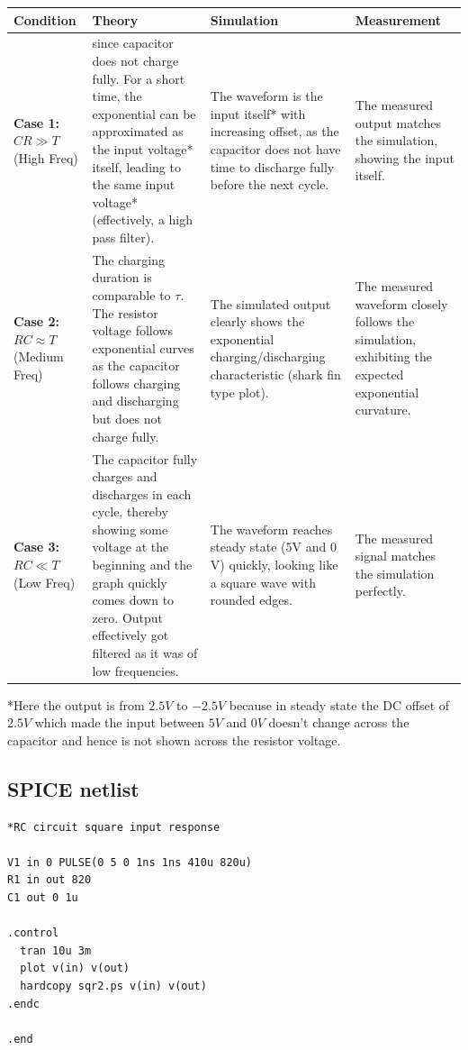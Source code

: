 \documentclass[12pt, a4paper]{article}
\begin{document}
\begin{table}[H]
    \centering
    \begin{tabular}{p{3cm} p{4cm} p{4cm} p{4cm}}
        \toprule
        \textbf{Condition} & \textbf{Theory} & \textbf{Simulation} & \textbf{Measurement} \\
        \midrule
        \textbf{Case 1:} $CR \gg T$ \newline (High Freq) & since capacitor does not charge fully. For a short time, the exponential can be approximated as the input voltage* itself, leading to the same input voltage* (effectively, a high pass filter). & The waveform is the input itself* with increasing offset, as the capacitor does not have time to discharge fully before the next cycle. & The measured output matches the simulation, showing the input itself. \\
        \midrule
        \textbf{Case 2:} $RC \approx T$ \newline (Medium Freq) & The charging duration is comparable to $\tau$. The resistor voltage follows exponential curves as the capacitor follows charging and discharging but does not charge fully. & The simulated output clearly shows the exponential charging/discharging characteristic (shark fin type plot). & The measured waveform closely follows the simulation, exhibiting the expected exponential curvature. \\
        \midrule
        \textbf{Case 3:} $RC \ll T$ \newline (Low Freq) & The capacitor fully charges and discharges in each cycle, thereby showing some voltage at the beginning and the graph quickly comes down to zero. Output effectively got filtered as it was of low frequencies. & The waveform reaches steady state ($5$V and $0$V) quickly, looking like a square wave with rounded edges. & The measured signal matches the simulation perfectly. \\
        \bottomrule
    \end{tabular}
\end{table}
*Here the output is from $2.5V$ to $-2.5V$ because in steady state the DC offset of $2.5 V$ which made the input between $5V$ and $0V$ doesn't change across the capacitor and hence is not shown across the resistor voltage.
\subsection{SPICE netlist}
\begin{lstlisting}
*RC circuit square input response

V1 in 0 PULSE(0 5 0 1ns 1ns 410u 820u)
R1 in out 820
C1 out 0 1u

.control
  tran 10u 3m
  plot v(in) v(out)
  hardcopy sqr2.ps v(in) v(out)
.endc

.end
\end{lstlisting}
\end{document}
